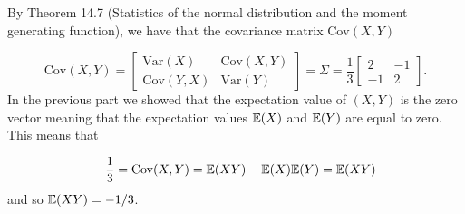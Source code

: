 
By Theorem 14.7 (Statistics of the normal distribution and the moment generating function), we have
that the covariance matrix $ \mathrm{Cov}(X,Y)$

\[
    \mathrm{Cov}(X,Y) = \begin{bmatrix}
	\mathrm{Var}(X) & \mathrm{Cov}(X,Y)\\
        \mathrm{Cov}(Y,X) & \mathrm{Var}(Y)
    \end{bmatrix} = \Sigma = \frac{1}{3}  \begin{bmatrix}
	2 & -1 \\
	-1 & 2
    \end{bmatrix}
.\]
In the previous part we showed that the expectation value of $ (X,Y)$ is the zero vector meaning
that the expectation values $ \mathbb{E}(X)$ and $ \mathbb{E} (Y)$ are equal to zero. This means that 

\[
    -\frac{1}{3} = \mathrm{Cov}(X,Y) = \mathbb{E}(XY) - \mathbb{E}(X) \mathbb{E}(Y) = \mathbb{E}(XY) 
\]
and so $ \mathbb{E}(XY) = -1/3$.
